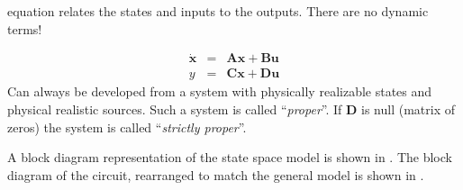 equation relates the states and inputs to the outputs. There are
no dynamic terms!
\begin{slide}\label{slide:l1s7}
\begin{eqnarray*}
\dot{\mathbf{x}}&=&\mathbf{A}\mathbf{x}+\mathbf{B}\mathbf{u}\\
{y}&=&\mathbf{C}\mathbf{x}+\mathbf{D}\mathbf{u}
\end{eqnarray*}
Can always be developed from a system with physically realizable
states and physical realistic sources. Such a system is called
``\emph{proper}''. If $\mathbf{D}$ is null (matrix of zeros) the
system is called ``\emph{strictly proper}''.
\end{slide}
A block diagram representation of the state space model is shown
in . The block diagram of the circuit, rearranged
to match the general model is shown in .
\begin{slide}\label{slide:l1s8}
\end{slide}
